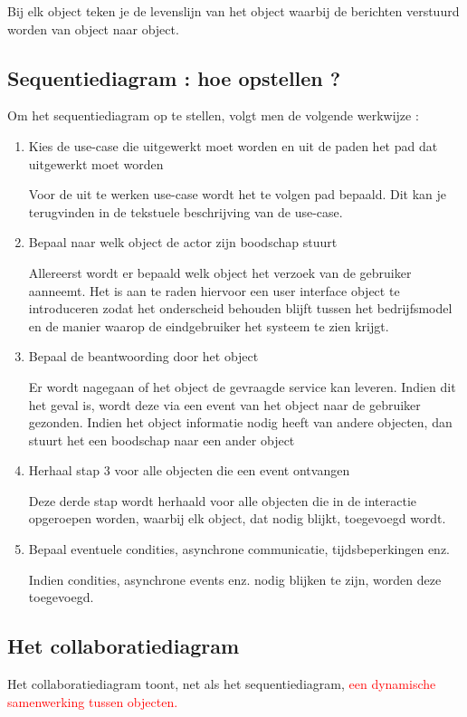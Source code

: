{Bij elk object teken je de levenslijn van het object waarbij de berichten verstuurd worden van object naar object.

\subsection{Sequentiediagram : hoe opstellen ?}

Om het sequentiediagram op te stellen, volgt men de volgende werkwijze :

\begin{enumerate}
\item Kies de use-case die uitgewerkt moet worden en uit de paden het pad dat uitgewerkt moet worden


Voor de uit te werken use-case wordt het te volgen pad bepaald. Dit kan je terugvinden in de tekstuele beschrijving van de use-case.
\item Bepaal naar welk object de actor zijn boodschap stuurt


Allereerst wordt er bepaald welk object het verzoek van de gebruiker aanneemt. Het is aan te raden hiervoor een user interface object te introduceren zodat het onderscheid behouden blijft tussen het bedrijfsmodel en de manier waarop de eindgebruiker het systeem te zien krijgt.
\item Bepaal de beantwoording door het object


Er wordt nagegaan of het object de gevraagde service kan leveren. Indien dit het geval is, wordt deze via een event van het object naar de gebruiker gezonden. Indien het object informatie nodig heeft van andere objecten, dan stuurt het een boodschap naar een ander object
\item Herhaal stap 3 voor alle objecten die een event ontvangen


Deze derde stap wordt herhaald voor alle objecten die in de interactie opgeroepen worden, waarbij elk object, dat nodig blijkt, toegevoegd wordt.
\item Bepaal eventuele condities, asynchrone communicatie, tijdsbeperkingen enz.


Indien condities, asynchrone events enz. nodig blijken te zijn, worden deze toegevoegd.
\end{enumerate}


\subsection{Het collaboratiediagram}

Het collaboratiediagram toont, net als het sequentiediagram, \textcolor{red}{een dynamische samenwerking tussen objecten.}

}
